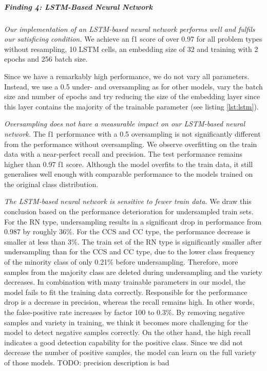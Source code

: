\subparagraph{Finding 4: LSTM-Based Neural Network}
\textit{Our implementation of an LSTM-based neural network performs well and fulfils our satisficing condition.} We achieve an f1 score of over 0.97 for all problem types without resampling, 10 LSTM cells, an embedding size of 32 and training with 2 epochs and 256 batch size. 


Since we have a remarkably high performance, we do not vary all parameters. Instead, we use a 0.5 under- and oversampling as for other models, vary the batch size and number of epochs and try reducing the size of the embedding layer since this layer contains the majority of the trainable parameter (see listing \ref{lst:lstm}).


\textit{Oversampling does not have a measurable impact on our LSTM-based neural network.} The f1 performance with a 0.5 oversampling is not significantly different from the performance without oversampling. We observe overfitting on the train data with a near-perfect recall and precision. The test performance remains higher than 0.97 f1 score. Although the model overfits to the train data, it still generalises well enough with comparable performance to the models trained on the original class distribution.


\textit{The LSTM-based neural network is sensitive to fewer train data.} We draw this conclusion based on the performance deterioration for undersampled train sets. For the RN type, undersampling results in a significant drop in performance from 0.987 by roughly 36\%. For the CCS and CC type, the performance decrease is smaller at less than 3\%. The train set of the RN type is significantly smaller after undersampling than for the CCS and CC type, due to the lower class frequency of the minority class of only 0.21\% before undersampling. Therefore, more samples from the majority class are deleted during undersampling and the variety decreases. In combination with many trainable parameters in our model, the model fails to fit the training data correctly. 
Responsible for the performance drop is a decrease in precision, whereas the recall remains high. In other words, the false-positive rate increases by factor 100 to 0.3\%. By removing negative samples and variety in training, we think it becomes more challenging for the model to detect negative samples correctly. On the other hand, the high recall indicates a good detection capability for the positive class. Since we did not decrease the number of positive samples, the model can learn on the full variety of those models. TODO: precision description is bad


